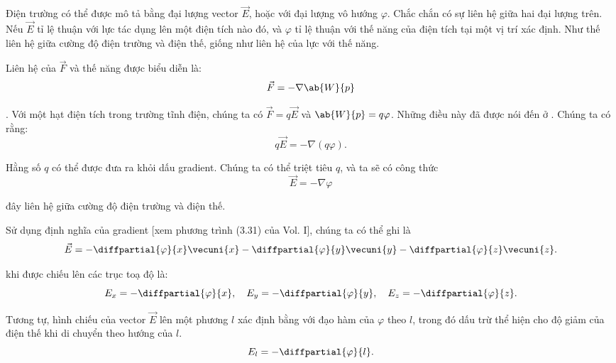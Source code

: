 Điện trường có thể được mô tả bằng đại lượng vector $\vec{E}$, hoặc với đại lượng vô hướng $\varphi$. Chắc chắn có sự liên hệ giữa hai đại lượng trên. Nếu $\vec{E}$ tỉ lệ thuận với lực tác dụng lên một điện tích nào đó, và $\varphi$ tỉ lệ thuận với thế năng của điện tích tại một vị trí xác định. Như thế liên hệ giữa cường độ điện trường và điện thế, giống như liên hệ của lực với thế năng.

Liên hệ của $\vec{F}$ và thế năng được biểu diễn là:
\begin{equation}\label{eq:1_40}
	\vec{F} = -\nabla\ab{W}{p}
\end{equation}

. Với một hạt điện tích trong trường tĩnh điện, chúng ta có $\vec{F}=q\vec{E}$ và $\ab{W}{p}=q\varphi$. Những điều này đã được nói đến ở . Chúng ta có rằng:
\begin{equation*}
	q \vec{E} = -\nabla(q\varphi).
\end{equation*}

\noindent
Hằng số $q$ có thể được đưa ra khỏi dấu gradient. Chúng ta có thể triệt tiêu $q$, và ta sẽ có công thức
\begin{equation}\label{eq:1_41}
	\vec{E} = -\nabla\varphi
\end{equation}

\noindent
đây liên hệ giữa cường độ điện trường và điện thế.

Sử dụng định nghĩa của gradient [xem phương trình (3.31) của Vol. I], chúng ta có thể ghi là
\begin{equation}\label{eq:1_42}
	\vec{E} = -\diffpartial{\varphi}{x}\vecuni{x} -\diffpartial{\varphi}{y}\vecuni{y} -\diffpartial{\varphi}{z}\vecuni{z}.
\end{equation}

\noindent
{} khi được chiếu lên các trục toạ độ là:
\begin{equation}\label{eq:1_43}
	E_x = -\diffpartial{\varphi}{x},\quad E_y = -\diffpartial{\varphi}{y},\quad E_z = -\diffpartial{\varphi}{z}.
\end{equation}

\noindent
Tương tự, hình chiếu của vector $\vec{E}$ lên một phương $l$ xác định bằng với đạo hàm của $\varphi$ theo $l$, trong đó dấu trừ thể hiện cho độ giảm của điện thế khi di chuyển theo hướng của $l$.   
\begin{equation}\label{eq:1_44}
	E_l = -\diffpartial{\varphi}{l}.
\end{equation}

